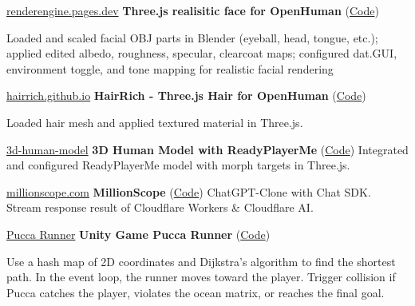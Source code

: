 


\begin{twocolentry}{\href{https://renderengine.pages.dev}{renderengine.pages.dev}}
	\textbf{Three.js realisitic face for OpenHuman} (\href{https://github.com/openhuman-ai/renderengine}{Code})
	\begin{highlights}
		\item Loaded and scaled facial OBJ parts in Blender (eyeball, head, tongue, etc.); applied edited albedo, roughness, specular, clearcoat maps; configured dat.GUI, environment toggle, and tone mapping for realistic facial rendering
	\end{highlights}
\end{twocolentry}

\begin{twocolentry}{\href{https://hairrich.github.io}{hairrich.github.io}}
	\textbf{HairRich - Three.js Hair for OpenHuman} (\href{https://github.com/hairrich/hairrich.github.io}{Code})
	\begin{highlights}
		\item Loaded hair mesh and applied textured material in Three.js.
	\end{highlights}
\end{twocolentry}


\begin{twocolentry}{\href{https://hmthanh.github.io/3d-human-model}{3d-human-model}}
	\textbf{3D Human Model with ReadyPlayerMe} (\href{https://github.com/hmthanh/3d-human-model}{Code})
	Integrated and configured ReadyPlayerMe model with morph targets in Three.js.
\end{twocolentry}

\cvspace

\begin{twocolentry}{\href{https://millionscope.com}{millionscope.com}}
	\textbf{MillionScope}  (\href{https://github.com/millionscope/millionscope.github.io}{Code}) ChatGPT-Clone with Chat SDK. Stream response result of Cloudflare Workers \& Cloudflare AI.
\end{twocolentry}

\cvspace

\begin{twocolentry}{\href{https://hmthanh.github.io/pucca_runner/}{Pucca Runner}}
	\textbf{Unity Game Pucca Runner} (\href{https://github.com/hmthanh/pucca_runner}{Code})
	\begin{highlights}
		\item Use a hash map of 2D coordinates and Dijkstra’s algorithm to find the shortest path. In the event loop, the runner moves toward the player. Trigger collision if Pucca catches the player, violates the ocean matrix, or reaches the final goal.
	\end{highlights}
\end{twocolentry}


